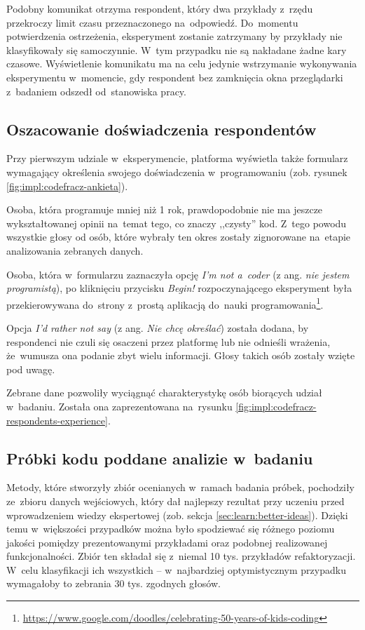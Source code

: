 \documentclass[twoside]{praca}
\begin{document}
Podobny komunikat otrzyma respondent, który dwa przykłady z~rzędu przekroczy limit czasu przeznaczonego na~odpowiedź. Do~momentu potwierdzenia ostrzeżenia, eksperyment zostanie zatrzymany by przykłady nie klasyfikowały się samoczynnie. W~tym przypadku nie są nakładane żadne kary czasowe. Wyświetlenie komunikatu ma na celu jedynie wstrzymanie wykonywania eksperymentu w~momencie, gdy respondent bez zamknięcia okna przeglądarki z~badaniem odszedł od~stanowiska pracy.

\subsection{Oszacowanie doświadczenia respondentów}

Przy pierwszym udziale w~eksperymencie, platforma wyświetla także formularz wymagający określenia swojego doświadczenia w~programowaniu (zob. rysunek \ref{fig:impl:codefracz-ankieta}). 

Osoba, która programuje mniej niż 1 rok, prawdopodobnie nie ma jeszcze wykształtowanej opinii na~temat tego, co znaczy ,,czysty'' kod. Z~tego powodu wszystkie głosy od osób, które wybrały ten okres zostały zignorowane na~etapie analizowania zebranych danych. 

Osoba, która w~formularzu zaznaczyła opcję \textit{I'm not a~coder} (z ang. \textit{nie jestem programistą}), po kliknięciu przycisku \textit{Begin!} rozpoczynającego eksperyment była przekierowywana do~strony z~prostą aplikacją do~nauki programowania\footnote{\url{https://www.google.com/doodles/celebrating-50-years-of-kids-coding}}. 

Opcja \textit{I'd rather not say} (z ang. \textit{Nie chcę określać}) została dodana, by respondenci nie czuli się osaczeni przez platformę lub nie odnieśli wrażenia, że~wumusza ona podanie zbyt wielu informacji. Głosy takich osób zostały wzięte pod uwagę.

Zebrane dane pozwoliły wyciągnąć charakterystykę osób biorących udział w~badaniu. Została ona zaprezentowana na~rysunku \ref{fig:impl:codefracz-respondents-experience}.

\subsection{Próbki kodu poddane analizie w~badaniu}

Metody, które stworzyły zbiór ocenianych w~ramach badania próbek, pochodziły ze~zbioru danych wejściowych, który dał najlepszy rezultat przy uczeniu przed wprowadzeniem wiedzy ekspertowej (zob. sekcja \ref{sec:learn:better-ideas}). Dzięki temu w~większości przypadków można było spodziewać się różnego poziomu jakości pomiędzy prezentowanymi przykładami oraz podobnej realizowanej funkcjonalności. Zbiór ten składał się z~niemal 10 tys. przykładów refaktoryzacji. W~celu klasyfikacji ich wszystkich -- w~najbardziej optymistycznym przypadku wymagałoby to zebrania 30 tys. zgodnych głosów.
\end{document}
